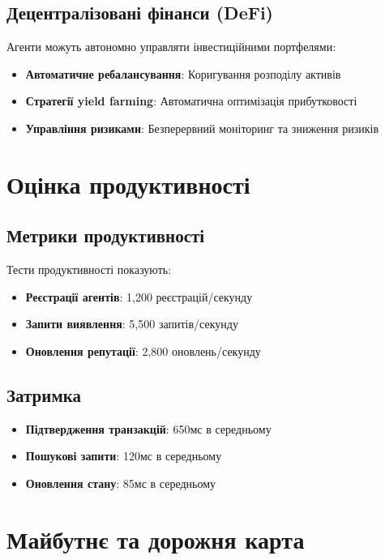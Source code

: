\documentclass[12pt,a4paper]{article}
\begin{document}
\subsection{Децентралізовані фінанси (DeFi)}

Агенти можуть автономно управляти інвестиційними портфелями:

\begin{itemize}
\item \textbf{Автоматичне ребалансування}: Коригування розподілу активів
\item \textbf{Стратегії yield farming}: Автоматична оптимізація прибутковості
\item \textbf{Управління ризиками}: Безперервний моніторинг та зниження ризиків
\end{itemize}

\section{Оцінка продуктивності}

\subsection{Метрики продуктивності}

Тести продуктивності показують:
\begin{itemize}
\item \textbf{Реєстрації агентів}: 1,200 реєстрацій/секунду
\item \textbf{Запити виявлення}: 5,500 запитів/секунду
\item \textbf{Оновлення репутації}: 2,800 оновлень/секунду
\end{itemize}

\subsection{Затримка}

\begin{itemize}
\item \textbf{Підтвердження транзакцій}: 650мс в середньому
\item \textbf{Пошукові запити}: 120мс в середньому
\item \textbf{Оновлення стану}: 85мс в середньому
\end{itemize}

\section{Майбутнє та дорожня карта}
\end{document}
